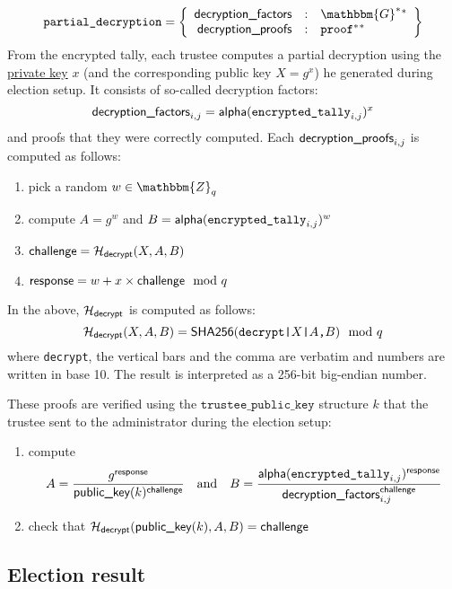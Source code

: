 \documentclass[a4paper]{article}
\newcommand{\G}{\mathbbm{G}}
\newcommand{\Z}{\mathbbm{Z}}
\newcommand{\shatwo}{\textsf{SHA256}}
\newcommand{\tpk}{\texttt{trustee\_public\_key}}
\newcommand{\etally}{\texttt{encrypted\_tally}}
\newcommand{\pdecryption}{\texttt{partial\_decryption}}
\begin{document}
\begin{gather*}
  \pdecryption=\left\{
    \begin{array}{rcl}
      \dfactors&:&\G^\ast{}^\ast\\
      \dproofs&:&\proof^\ast{}^\ast
    \end{array}
  \right\}
\end{gather*}
From the encrypted tally, each trustee computes a partial decryption
using the \hyperref[trustee-keys]{private key} $x$ (and the
corresponding public key $X=g^x$) he generated during election
setup. It consists of so-called decryption factors:
\[
\dfactors_{i,j}=\alphalabel(\etally_{i,j})^x
\]
and proofs that they were correctly computed. Each $\textsf{decryption\_proofs}_{i,j}$ is
computed as follows:
\begin{enumerate}
\item pick a random $w\in\Z_q$
\item compute $A=g^w$ and $B=\alphalabel(\etally_{i,j})^w$
\item $\textsf{challenge}=\mathcal{H}_{\textsf{decrypt}}(X,A,B)$
\item $\textsf{response}=w+x\times\textsf{challenge}\mod q$
\end{enumerate}
In the above, $\mathcal{H}_{\textsf{decrypt}}$ is computed as follows:
\[
\Hash_\decrypt(X,A,B)=\shatwo(\verb=decrypt|=X\verb=|=A\verb=,=B)\mod q
\]
where \verb=decrypt=, the vertical bars and the comma are verbatim and
numbers are written in base 10. The result is interpreted as a 256-bit
big-endian number.

These proofs are verified using the $\tpk$ structure $k$ that the
trustee sent to the administrator during the election setup:
\begin{enumerate}
\item compute
\[
A=\frac{g^\response}{\pklabel(k)^\challenge}
\quad\text{and}\quad
B=\frac{\alphalabel(\etally_{i,j})^\response}{\dfactors_{i,j}^\challenge}
\]
\item check that $\mathcal{H}_{\textsf{decrypt}}(\textsf{public\_key}(k),A,B)=\textsf{challenge}$
\end{enumerate}

\subsection{Election result}
\label{election-result}

\newcommand{\ntallied}{\textsf{num\_tallied}}
\newcommand{\etallylabel}{\textsf{encrypted\_tally}}
\newcommand{\pdlabel}{\textsf{partial\_decryptions}}
\newcommand{\resultlabel}{\textsf{result}}
\end{document}
